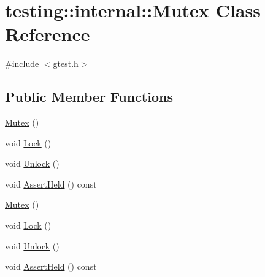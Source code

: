 \hypertarget{classtesting_1_1internal_1_1_mutex}{\section{testing\-:\-:internal\-:\-:Mutex Class Reference}
\label{classtesting_1_1internal_1_1_mutex}
}


{\ttfamily \#include $<$gtest.\-h$>$}

\subsection*{Public Member Functions}
\begin{DoxyCompactItemize}
\item 
\hyperlink{classtesting_1_1internal_1_1_mutex_a38e1833a78e3eec81ad23ce1b056b40e}{Mutex} ()
\item 
void \hyperlink{classtesting_1_1internal_1_1_mutex_ae7e2191886c00182176b23c4f4d049f8}{Lock} ()
\item 
void \hyperlink{classtesting_1_1internal_1_1_mutex_a315188055de1be98884519ad84eff2e6}{Unlock} ()
\item 
void \hyperlink{classtesting_1_1internal_1_1_mutex_a3a0530bca3110025d85b2aa51f3ca0d7}{Assert\-Held} () const 
\item 
\hyperlink{classtesting_1_1internal_1_1_mutex_a38e1833a78e3eec81ad23ce1b056b40e}{Mutex} ()
\item 
void \hyperlink{classtesting_1_1internal_1_1_mutex_ae7e2191886c00182176b23c4f4d049f8}{Lock} ()
\item 
void \hyperlink{classtesting_1_1internal_1_1_mutex_a315188055de1be98884519ad84eff2e6}{Unlock} ()
\item 
void \hyperlink{classtesting_1_1internal_1_1_mutex_a3a0530bca3110025d85b2aa51f3ca0d7}{Assert\-Held} () const 
\end{DoxyCompactItemize}


